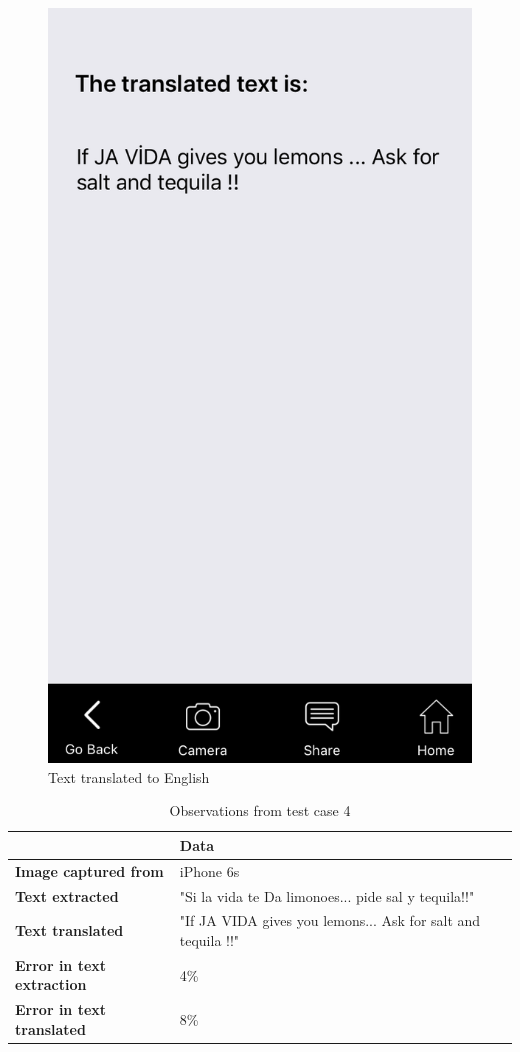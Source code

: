 \documentclass[12pt]{article}
\begin{document}
       \begin{figure}[H]
	\centering
	\includegraphics[width=0.5\linewidth]{media/case4b.png}
	\caption{Text translated to English}
	\label{fig:engs}
\end{figure} 

\begin{table}%
    \centering
    \caption{Observations from test case 4} 
    \label{my-label4}
       \begin{tabular}{|p{30mm}|p{55mm}|p{35mm}|}
 \hline
  & \textbf{Data}  \\ [0.5ex] 
 \hline\hline
 \textbf{Image captured from} & iPhone 6s \\
 \hline
  \textbf{Text extracted} & "Si la vida te Da limonoes... pide sal y tequila!!"  \\
 \hline
 \textbf{Text translated} & "If JA VIDA gives you lemons... Ask for salt and tequila !!"   \\
 \hline
 \textbf{Error in text extraction} & 4\%   \\
 \hline
 \textbf{Error in text translated} & 8\%   \\ [1ex] 
 \hline
    \end{tabular}
\end{table}
\end{document}

